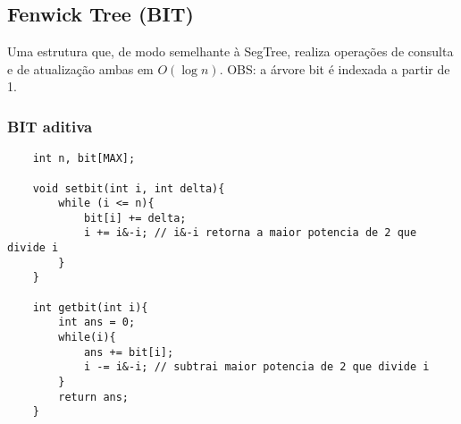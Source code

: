 \subsection{Fenwick Tree (BIT)}

\par Uma estrutura que, de modo semelhante à SegTree, realiza operações de consulta e de atualização ambas em $O(\log n)$. OBS: a árvore bit é indexada a partir de 1.

\subsubsection{BIT aditiva}

\begin{verbatim}
    int n, bit[MAX];

    void setbit(int i, int delta){
        while (i <= n){
            bit[i] += delta;
            i += i&-i; // i&-i retorna a maior potencia de 2 que divide i
        }
    }

    int getbit(int i){
        int ans = 0;
        while(i){
            ans += bit[i];
            i -= i&-i; // subtrai maior potencia de 2 que divide i
        }
        return ans;
    }
\end{verbatim}
    
\pagebreak

